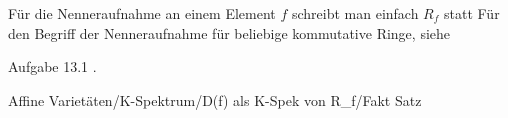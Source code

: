 Für die Nenneraufnahme an einem Element $f$ schreibt man einfach $R_f$ statt
 Für den Begriff der Nenneraufnahme für beliebige kommutative Ringe, siehe

Aufgabe 13.1
.





{Affine Varietäten/K-Spektrum/D(f) als K-Spek von R_f/Fakt}
{Satz}
{}
{



\faktsituation {}
\faktzusatz {}
\faktzusatz {}





}
